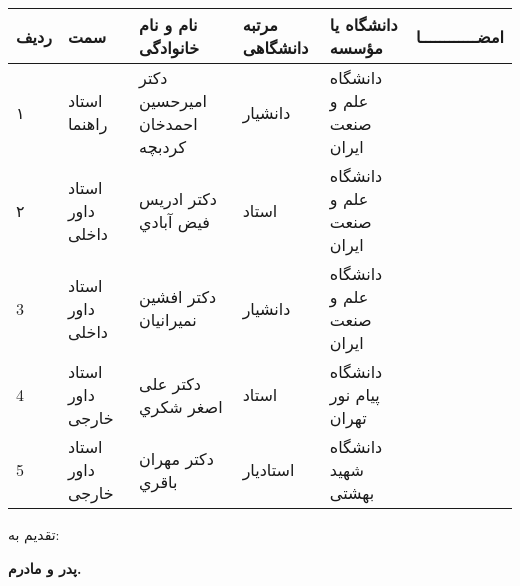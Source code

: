 \begin{center}
\begin{tabular}{| p{8mm} | p{18mm} | p{} |p{14mm}|p{}|c|}
\hline
ردیف	& سمت & نام و نام خانوادگی & مرتبه \newline دانشگاهی &	دانشگاه یا مؤسسه & امضــــــــــــا\\
\hline
۱  & استاد راهنما & دکتر \newline امیرحسین احمدخان کردبچه
& دانشیار & دانشگاه \newline علم و صنعت ایران &  \\
\hline
۲ & استاد داور \newline داخلی	 & دکتر \newline ادریس فیض
آبادي  & استاد & 
دانشگاه  \newline علم ‌و صنعت ایران & \\
\hline
3 & استاد داور \newline داخلی	 & دکتر \newline افشین نمیرانیان  & دانشیار & 
دانشگاه  \newline علم ‌و صنعت ایران & \\
\hline
4 &	استاد داور \newline  خارجی  & دکتر 
\newline علی اصغر شکري
& استاد & دانشگاه \newline  پیام نور تهران  & \\
\hline
5 &	استاد داور \newline  خارجی  & دکتر 
\newline  مهران باقري 
& استادیار & دانشگاه \newline  شهید بهشتی  & \\
\hline
\end{tabular}
\end{center}

\esalatPage
\mojavezPage

 \newpage
\thispagestyle{empty}
{\Large تقدیم به:}\\
\begin{flushleft}
{\huge
\textbf{
پدر و مادرم.
}}
\end{flushleft}


